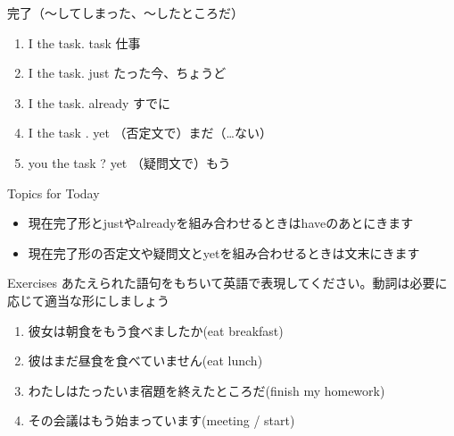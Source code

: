 \documentclass[aspectratio=169,xcolor={dvipsnames,table}]{beamer}
\begin{document}
\begin{frame}[plain]{完了（～してしまった、～したところだ）}
\begin{enumerate}
 \item<1-> I  the task.%
\hfill{}{\scriptsize task  仕事}
 \item<2-> I    the task.%
\hfill{}{\scriptsize just  たった今、ちょうど}
 \item<3-> I    the task.%
\hfill{}{\scriptsize already  すでに}
 \item<4-> I    the task .%
\hfill{}{\scriptsize yet  （否定文で）まだ（\ldots ない）}
 \item<5->  you  the task ?%
\hfill{}{\scriptsize yet  （疑問文で）もう}
\end{enumerate}

 \begin{exampleblock}{Topics for Today}
\small
\begin{itemize}[square]\small
 \item 現在完了形とjustやalreadyを組み合わせるときはhaveのあとにきます
 \item 現在完了形の否定文や疑問文とyetを組み合わせるときは文末にきます
\end{itemize}
      \end{exampleblock}
\end{frame}
\begin{frame}[plain]{Exercises}
 あたえられた語句をもちいて英語で表現してください。動詞は必要に応じて適当な形にしましょう

\begin{enumerate}
 \item 彼女は朝食をもう食べましたか(eat breakfast)\\
 \item 彼はまだ昼食を食べていません(eat lunch)\\
 \item わたしはたったいま宿題を終えたところだ(finish my homework)\\
 \item その会議はもう始まっています(meeting /  start)\\
\end{enumerate}
\end{frame}
\end{document}
